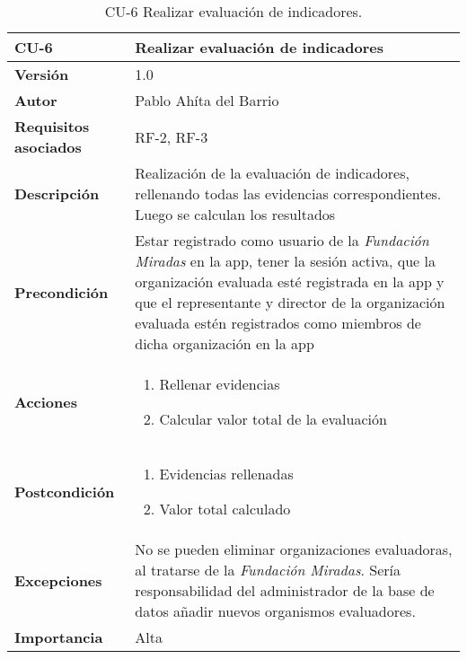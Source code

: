 \begin{table}[p]
	\centering
	\begin{tabularx}{\linewidth}{ p{} p{} }
		\toprule
		\textbf{CU-6}    & \textbf{Realizar evaluación de indicadores}\\
		\toprule
		\textbf{Versión}              & 1.0    \\
		\textbf{Autor}                & Pablo Ahíta del Barrio \\
		\textbf{Requisitos asociados} & RF-2, RF-3  \\
		\textbf{Descripción}          & Realización de la evaluación de indicadores, rellenando todas las evidencias correspondientes. Luego se calculan los resultados \\
		\textbf{Precondición}         & Estar registrado como usuario de la
		\textit{Fundación Miradas} en la app, tener la sesión activa, que la
		organización evaluada esté registrada en la app y que el representante y
		director de la organización evaluada estén registrados como miembros de
		dicha organización en la app\\
		\textbf{Acciones}             &
		\begin{enumerate}
			\def\labelenumi{\arabic{enumi}.}
			\tightlist
			\item Rellenar evidencias
			\item Calcular valor total de la evaluación
		\end{enumerate}\\
		\textbf{Postcondición}        &  
		\begin{enumerate}
			\def\labelenumi{\arabic{enumi}.}
			\tightlist
			\item Evidencias rellenadas
			\item Valor total calculado
		\end{enumerate}\\
		\textbf{Excepciones}          & No se pueden eliminar organizaciones
		evaluadoras, al tratarse de la \textit{Fundación Miradas}. Sería
		responsabilidad del administrador de la base de datos añadir nuevos
		organismos evaluadores. \\
		\textbf{Importancia}          & Alta \\
		\bottomrule
	\end{tabularx}
	\caption{CU-6 Realizar evaluación de indicadores.}
\end{table}

